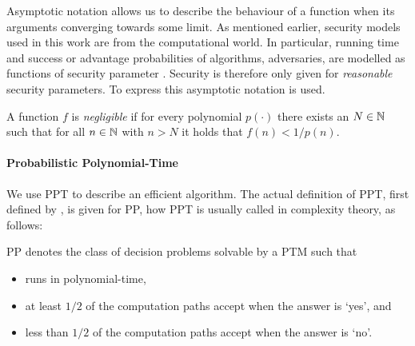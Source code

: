 Asymptotic notation allows us to describe the behaviour of a function when its arguments converging towards some limit.
As mentioned earlier, security models used in this work are from the computational world.
In particular, running time and success or advantage probabilities of algorithms, \ie adversaries, are modelled as functions of security parameter \secpar.
Security is therefore only given for \emph{reasonable} security parameters.
To express this asymptotic notation is used.

\begin{definition}\label{def:negligible}
A function $f$ is \emph{negligible} if for every polynomial $p(\cdot)$ there exists an $N\in\mathbb{N}$ such that for all $n\in\mathbb{N}$ with $n>N$ it holds that $f(n)<1/p(n)$.
\eod
\end{definition}

% 	

\paragraph{Probabilistic Polynomial-Time}
We use \ac{PPT} to describe an efficient algorithm.
The actual definition of \ac{PPT}, first defined by \citet{gill1977}, is given for \ac{PP}, how \ac{PPT} is usually called in complexity theory, as follows:

\begin{definition}[\acl{PP}]\label{def:ppt}
\ac{PP} denotes the class of decision problems solvable by a \ac{PTM} \cA such that
\begin{itemize}
	\item \cA runs in polynomial-time,
	\item at least $1/2$ of the computation paths accept when the answer is `yes', and
	\item less than $1/2$ of the computation paths accept when the answer is `no'.  \eod
\end{itemize}
\end{definition}

